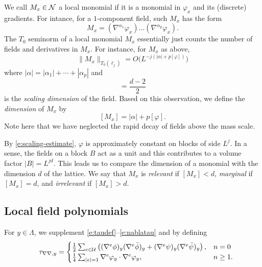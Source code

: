 We call $M_x \in \mathcal{N}$ a local monomial if it is a monomial in $\varphi_x$ and its
(discrete) gradients. For intance, for a $1$-component field, such $M_x$ has the form
\begin{equation}
\label{e:field-mon}
M_x = (\nabla^{\alpha_1} \varphi_x) \ldots (\nabla^{\alpha_p} \varphi_x).
\end{equation}
The $T_0$ seminorm of a local monomial $M_x$ essentially
just counts the number of fields and derivatives in $M_x$. For instance, for $M_x$
as above,
\begin{equation}
\|M_x\|_{T_0(\ell_j)}
	=
O\big(L^{-j (|\alpha| + p [\varphi])}\big)
\end{equation}
where $|\alpha| = |\alpha_1| + \cdots + |\alpha_p|$ and
\begin{equation}
[\varphi] = \frac{d - 2}{2}
\end{equation}
is the \emph{scaling dimension} of the field.
Based on this observation, we define the
\emph{dimension} of $M_x$ by
\begin{equation}
\label{e:mon-dim}
[M_x] = |\alpha| + p [\varphi].
\end{equation}
Note here that we have neglected the rapid decay of fields above the mass scale.

By \eqref{e:scaling-estimate}, $\varphi$ is approximately constant on blocks of side $L^j$. In a sense,
the fields on a block $B$ act as a unit and this contributes to a volume factor $|B| = L^{jd}$.
This leads us to compare the dimension of a monomial with the dimension $d$ of the
lattice. We say that $M_x$ is \emph{relevant} if $[M_x] < d$, \emph{marginal} if
$[M_x] = d$, and \emph{irrelevant} if $[M_x] > d$.


\subsection{Local field polynomials}

For $y \in \Lambda$, we supplement \eqref{e:taudef}--\eqref{e:nablatau} and 
by defining
\begin{equation}
\label{e:tauphi2}
\quad \tau_{\nabla\nabla,y}
	=
\begin{cases}
\frac 12 \sum_{e \in \mathcal{U}}
\left(
	(\nabla^e \phi)_y (\nabla^e \bar\phi)_y +
	(\nabla^e \psi)_y (\nabla^e \bar\psi)_y
\right),
	& n = 0 \\
\frac{1}{4} \sum_{|e| = 1} \nabla^e \varphi_y \cdot \nabla^e \varphi_y,
	& n \ge 1.
\end{cases}
\end{equation}

